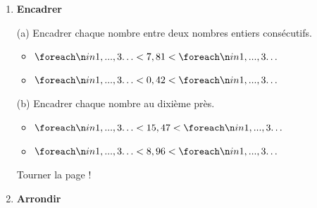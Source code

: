 \documentclass[a4paper]{book}
\begin{document}
{\begin{exercice}
\begin{enumerate}[leftmargin=*]
\begin{enumerate}[leftmargin=*]
                \begin{ZoneReponse}{2cm}
                \end{ZoneReponse}
            \end{enumerate}

          
            \item \textbf{Encadrer}
    
            \medskip
                        
            \begin{minipage}{0.45\linewidth}
                (a) Encadrer chaque nombre entre deux nombres entiers consécutifs.

                \medskip
                
                \begin{itemize}
                    \item $\points[3] < 7,81 < \points[3]$
    
                    \bigskip
                    
                    \item $\points[3] < 0,42 < \points[3]$
                \end{itemize}
            \end{minipage}
            \hfill
            \begin{minipage}{0.45\linewidth}
                (b) Encadrer chaque nombre au dixième près.
                
                \medskip
                
                \begin{itemize}
                    \item $\points[3] < 15,47 < \points[3]$
    
                    \bigskip
                    
                    \item $\points[3] < 8,96 < \points[3]$
                \end{itemize}
    
                \vspace{0.5cm}
            \end{minipage}

\vfill \hfill Tourner la page !

\newpage
             
        \item \textbf{Arrondir}

            \medskip
        

\end{enumerate}
\end{exercice}}
\end{document}
